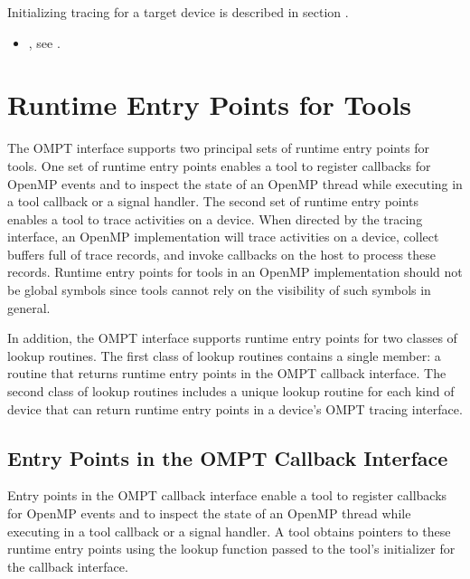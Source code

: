 Initializing tracing for a target device is described in section
. 

\crossreferences
\begin{itemize}
\item {}, see
  .
\end{itemize}

\section{Runtime Entry Points for Tools}
\label{sec:entry-points}

The OMPT interface supports two principal sets of runtime entry points for tools. One
set of runtime entry points enables a tool to register callbacks for OpenMP
events and to inspect the state of an OpenMP thread while
executing in a tool callback or a signal handler. The second set of runtime entry points enables a
tool to trace activities on a device. When directed by the tracing
interface, an OpenMP implementation will trace activities on a device, collect
buffers full of trace records, and invoke callbacks on the host to
process these records. 
Runtime entry points for tools in an OpenMP implementation
should not be global symbols since tools cannot rely on the visibility
of such symbols in general.

In addition, the OMPT interface supports
runtime entry points for two classes of lookup routines. The first
class of lookup routines contains a single member: a
routine that returns runtime entry points in the OMPT callback interface. 
The second class of lookup routines includes 
a unique lookup routine for each kind of
device that can return runtime entry points in a device's OMPT tracing interface.

\subsection{Entry Points in the OMPT Callback Interface}
\label{sec:ompt-callback-entry-points}

Entry points in the OMPT callback interface enable a tool to register
callbacks for OpenMP events and to inspect the state of an OpenMP thread while
executing in a tool callback or a signal handler. 
A tool obtains pointers to these runtime entry points 
using the lookup function passed to the tool's initializer for the
callback interface.

\label{sec:ompt_enumerate_states_t}
\label{sec:ompt_enumerate_states}

